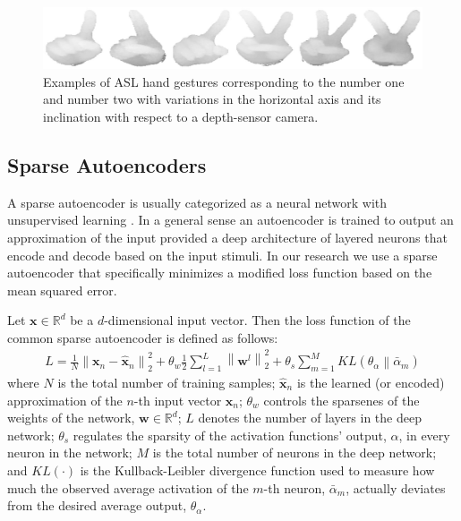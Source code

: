 \documentclass[a4paper]{article}
\begin{document}
\begin{figure}
\centering
\includegraphics[width=12.2cm]{img/sampleNum1.eps}
\caption{Examples of ASL hand gestures corresponding to the number one and 
number two with variations in
the horizontal axis and its inclination with respect to a depth-sensor camera.}
\label{fig:sampN1}
\end{figure}


\subsection{Sparse Autoencoders}

A sparse autoencoder is usually categorized as a neural network with
unsupervised learning \cite{le2013building}. In a general sense an autoencoder
is trained to output an approximation of the input provided a deep architecture
of layered neurons that encode and decode based on the input stimuli. 
In our research we use a sparse autoencoder that specifically
minimizes a modified loss function based on the mean squared error. 

Let $\mathbf{x} \in \mathbb{R}^d$ be a $d$-dimensional input vector. Then the
loss function of the common sparse autoencoder is defined as follows:
\begin{align}
L=\frac{1}{N} \left\| \mathbf{x}_n - \mathbf{\hat{x}}_n  \right\|^2_2
+ \theta_w \frac{1}{2} \sum^L_{l=1} \left\| \mathbf{w}^l \right\|^2_2 +
\theta_s \sum^{M}_{m=1} KL \left( \theta_\alpha \left\| \bar{\alpha}_m \right. \right)
\label{eq:loss}
\end{align}
where $N$ is the total number of training samples; 
$\mathbf{\hat{x}}_n$ is the learned (or encoded) approximation of the
$n$-th input vector $\mathbf{x}_n$;
$\theta_w$ controls the sparsenes of the weights of the network, $\mathbf{w} \in
\mathbb{R}^d$;
$L$ denotes the number of layers in the deep network;
$\theta_s$ regulates the sparsity of the activation functions' output,
$\alpha$, in every neuron in the network;
$M$ is the total number of neurons in the deep network;
and $KL(\cdot)$ is the Kullback-Leibler divergence function 
\cite{joyce2011kullback} used to measure how
much the observed average activation of the $m$-th neuron, $\bar{\alpha}_m$,
actually deviates from the desired average output, $\theta_\alpha$.
\end{document}
